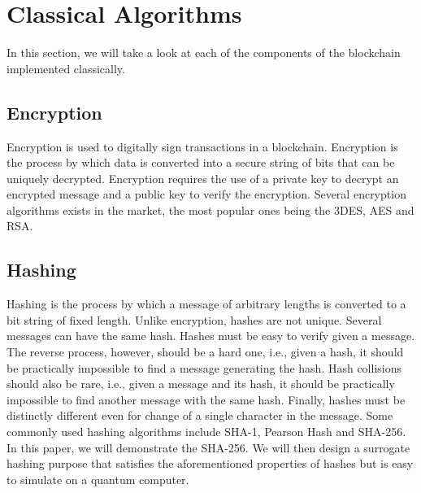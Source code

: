 \section{Classical Algorithms}
In this section, we will take a look at each of the components of the blockchain implemented classically.
\subsection{Encryption}
Encryption is used to digitally sign transactions in a blockchain. Encryption is the process by which data is converted into a secure string of bits that can be uniquely decrypted. Encryption requires the use of a private key to decrypt an encrypted message and a public key to verify the encryption. Several encryption algorithms exists in the market, the most popular ones being the 3DES, AES and RSA\cite{enc_rsa}. 
\subsection{Hashing}
Hashing is the process by which a message of arbitrary lengths is converted to a bit string of fixed length. Unlike encryption, hashes are not unique. Several messages can have the same hash. Hashes must be easy to verify given a message. The reverse process, however, should be a hard one, i.e., given a hash, it should be practically impossible to find a message generating the hash. Hash collisions should also be rare, i.e., given a message and its hash, it should be practically impossible to find another message with the same hash. Finally, hashes must be distinctly different even for change of a single character in the message. Some commonly used hashing algorithms include SHA-1, Pearson Hash and SHA-256. In this paper, we will demonstrate the SHA-256. We will then design a surrogate hashing purpose that satisfies the aforementioned properties of hashes but is easy to simulate on a quantum computer.

